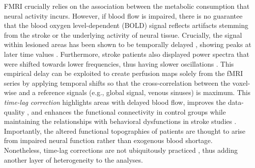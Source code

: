 \documentclass[fleqn,10pt]{wlscirep}
\begin{document}
FMRI crucially relies on the association between the metabolic consumption that neural activity incurs. However, if blood flow is impaired, there is no guarantee that the blood oxygen level-dependent (BOLD) signal reflects artifacts stemming from the stroke or the underlying activity of neural tissue. Crucially, the signal within lesioned areas has been shown to be temporally delayed \citep{siegel2016effects}, showing peaks at later time values \citep{altamura2009longitudinal,bonakdarpour2015variability}. Furthermore, stroke patients also displayed power spectra that were shifted towards lower frequencies, thus having slower oscillations \citep{siegel2016effects}. This empirical delay can be exploited to create perfusion maps solely from the fMRI series \citep{lv2013identifying,tong2017perfusion,khalil2020non,braban2023cerebrovascular} by applying temporal shifts so that the cross-correlation between the voxel-wise and a reference signals (e.g., global signal, venous sinuses) is maximum. This \textit{time-lag correction} highlights areas with delayed blood flow, improves the data-quality \citep{erdougan2016correcting}, and enhances the functional connectivity in control groups \citep{tong2017perfusion} while maintaining the relationships with behavioral dysfunctions in stroke studies \citep{siegel2016effects}. Importantly, the altered functional topographies of patients are thought to arise from impaired neural function rather than exogenous blood shortage. Nonetheless, time-lag corrections are not ubiquitously practiced \citep{bayrak2019impact}, thus adding another layer of heterogeneity to the analyses.
\end{document}
